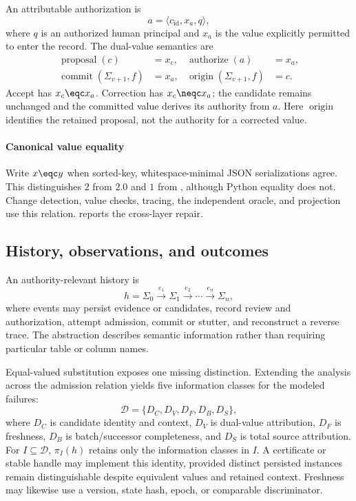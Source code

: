 An attributable authorization is
\begin{equation}
a=\langle c_{\mathrm{id}},x_a,q\rangle,
\label{eq:authorization}
\end{equation}
where $q$ is an authorized human principal and $x_a$ is the value explicitly permitted to enter the record. The dual-value semantics are
\begin{align}
\operatorname{proposal}(c)&=x_c, &
\operatorname{authorize}(a)&=x_a,\nonumber\\
\operatorname{commit}(\Sigma_{v+1},f)&=x_a, &
\operatorname{origin}(\Sigma_{v+1},f)&=c.
\label{eq:dual-value}
\end{align}
Accept has $x_c\eqc x_a$. Correction has $x_c\neqc x_a$; the candidate remains unchanged and the committed value derives its authority from $a$. Here $\operatorname{origin}$ identifies the retained proposal, not the authority for a corrected value.


\paragraph{Canonical value equality}
Write $x\eqc y$ when sorted-key, whitespace-minimal JSON serializations agree. This distinguishes $2$ from $2.0$ and $1$ from , although Python equality does not. Change detection, value checks, tracing, the independent oracle, and projection use this relation.  reports the cross-layer repair.

\subsection{History, observations, and outcomes}

An authority-relevant history is
\begin{equation}
h=\Sigma_0\xrightarrow{e_1}\Sigma_1\xrightarrow{e_2}\cdots\xrightarrow{e_n}\Sigma_n,
\end{equation}
where events may persist evidence or candidates, record review and authorization, attempt admission, commit or stutter, and reconstruct a reverse trace. The abstraction describes semantic information rather than requiring particular table or column names.

Equal-valued substitution exposes one missing distinction. Extending the analysis across the admission relation yields five information classes for the modeled failures:
\begin{equation}
\mathcal D=\{D_C,D_V,D_F,D_B,D_S\},
\label{eq:distinction-basis}
\end{equation}
where $D_C$ is candidate identity and context, $D_V$ is dual-value attribution, $D_F$ is freshness, $D_B$ is batch/successor completeness, and $D_S$ is total source attribution. For $I\subseteq\mathcal D$, $\pi_I(h)$ retains only the information classes in $I$. A certificate or stable handle may implement this identity, provided distinct persisted instances remain distinguishable despite equivalent values and retained context. Freshness may likewise use a version, state hash, epoch, or comparable discriminator.

